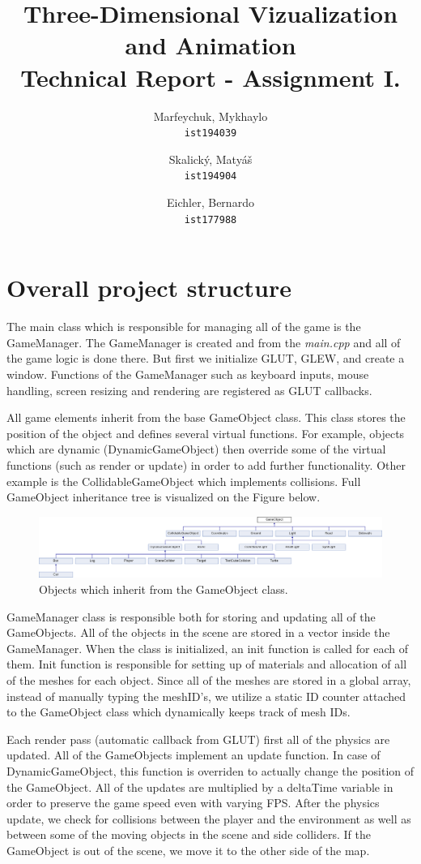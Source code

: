 \documentclass[a4paper,10pt]{article}
\title{Three-Dimensional Vizualization and Animation\\Technical Report - Assignment I.}
\author{
  Marfeychuk, Mykhaylo\\
  \texttt{ist194039}
  \and
  Skalický, Matyáš\\
  \texttt{ist194904}
  \and
  Eichler, Bernardo\\
  \texttt{ist177988}
}
\date{} %
\begin{document}
\maketitle

\section{Overall project structure}
The main class which is responsible for managing all of the game is the GameManager. The GameManager is created and from the \textit{main.cpp} and all of the game logic is done there. But first we initialize GLUT, GLEW, and create a window. Functions of the GameManager such as keyboard inputs, mouse handling, screen resizing and rendering are registered as GLUT callbacks.

All game elements inherit from the base GameObject class. This class stores the position of the object and defines several virtual functions. For example, objects which are dynamic (DynamicGameObject) then override some of the virtual functions (such as render or update) in order to add further functionality. Other example is the CollidableGameObject which implements collisions. Full GameObject inheritance tree is visualized on the Figure below.

\begin{figure}[!htb]
	\centering
  	\includegraphics[width=\linewidth]{images/image1.png}
  	\caption{Objects which inherit from the GameObject class.}
\end{figure}

GameManager class is responsible both for storing and updating all of the GameObjects. All of the objects in the scene are stored in a vector inside the GameManager. When the class is initialized, an init function is called for each of them. Init function is responsible for setting up of materials and allocation of all of the meshes for each object. Since all of the meshes are stored in a global array, instead of manually typing the meshID's, we utilize a static ID counter attached to the GameObject class which dynamically keeps track of mesh IDs.

Each render pass (automatic callback from GLUT) first all of the physics are updated. All of the GameObjects implement an update function. In case of DynamicGameObject, this function is overriden to actually change the position of the GameObject. All of the updates are multiplied by a deltaTime variable in order to preserve the game speed even with varying FPS. After the physics update, we check for collisions between the player and the environment as well as between some of the moving objects in the scene and side colliders. If the GameObject is out of the scene, we move it to the other side of the map.
\end{document}
